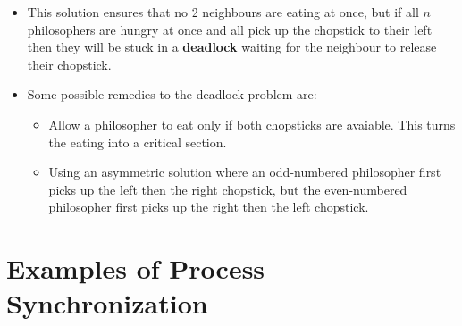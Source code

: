 \documentclass{article}
\theoremstyle{plain}
\theoremstyle{definition}
\begin{document}
\begin{itemize}
    \item This solution ensures that no 2 neighbours are eating at once, but if all $n$ philosophers are hungry at once and all pick up the chopstick to their left then they will be stuck in a \textbf{deadlock} waiting for the neighbour to release their chopstick.
    
    \item Some possible remedies to the deadlock problem are:
    \begin{itemize}
        \item Allow a philosopher to eat only if both chopsticks are avaiable. This turns the eating into a critical section.
        
        \item Using an asymmetric solution where an odd-numbered philosopher first picks up the left then the right chopstick, but the even-numbered philosopher first picks up the right then the left chopstick. 
    \end{itemize}
\end{itemize}

\section{Examples of Process Synchronization}
\end{document}
